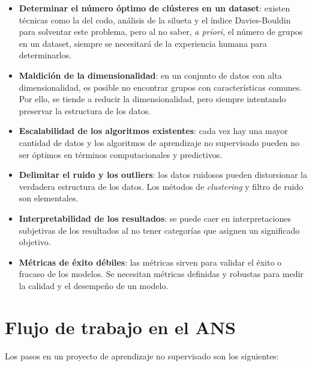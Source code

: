 \begin{itemize}
    \item \textbf{Determinar el número óptimo de clústeres en un dataset}: existen técnicas como la del codo, análisis de la silueta y el índice Davies-Bouldin para solventar este problema, pero al no saber, \textit{a priori}, el número de grupos en un dataset, siempre se necesitará de la experiencia humana para determinarlos.

    \item \textbf{Maldición de la dimensionalidad}: en un conjunto de datos con alta dimensionalidad, es posible no encontrar grupos con características comunes. Por ello, se tiende a reducir la dimensionalidad, pero siempre intentando preservar la estructura de los datos.

    \item \textbf{Escalabilidad de los algoritmos existentes}: cada vez hay una mayor cantidad de datos y los algoritmos de aprendizaje no supervisado pueden no ser óptimos en términos computacionales y predictivos.

    \item \textbf{Delimitar el ruido y los outliers}: los datos ruidosos pueden distorsionar la verdadera estructura de los datos. Los métodos de \textit{clustering} y filtro de ruido son elementales.

    \item \textbf{Interpretabilidad de los resultados}: se puede caer en interpretaciones subjetivas de los resultados al no tener categorías que asignen un significado objetivo. 

    \item \textbf{Métricas de éxito débiles}: las métricas sirven para validar el éxito o fracaso de los modelos. Se necesitan métricas definidas y robustas para medir la calidad y el desempeño de un modelo.
\end{itemize}


\section{Flujo de trabajo en el ANS}

Los pasos en un proyecto de aprendizaje no supervisado son los siguientes:

